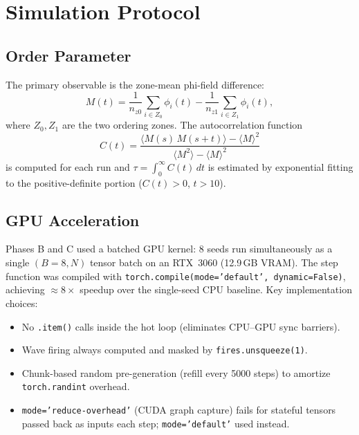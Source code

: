 \documentclass[12pt,a4paper]{article}
\begin{document}
\section{Simulation Protocol}

\subsection{Order Parameter}

The primary observable is the zone-mean phi-field difference:
\begin{equation}
  M(t) = \frac{1}{n_{z0}}\sum_{i \in Z_0} \phi_i(t)
        - \frac{1}{n_{z1}}\sum_{i \in Z_1} \phi_i(t),
\end{equation}
where $Z_0, Z_1$ are the two ordering zones.  The autocorrelation function
\begin{equation}
  C(t) = \frac{\langle M(s)\,M(s+t)\rangle - \langle M\rangle^2}
              {\langle M^2\rangle - \langle M\rangle^2}
\end{equation}
is computed for each run and $\tau = \int_0^\infty C(t)\,dt$ is estimated
by exponential fitting to the positive-definite portion ($C(t) > 0$, $t > 10$).

\subsection{GPU Acceleration}

Phases B and C used a batched GPU kernel: 8 seeds run simultaneously as a single
$(B=8, N)$ tensor batch on an RTX~3060 (12.9\,GB VRAM).  The step function was
compiled with \texttt{torch.compile(mode='default', dynamic=False)}, achieving
$\approx 8\times$ speedup over the single-seed CPU baseline.  Key implementation
choices:
\begin{itemize}
  \item No \texttt{.item()} calls inside the hot loop (eliminates CPU--GPU sync barriers).
  \item Wave firing always computed and masked by \texttt{fires.unsqueeze(1)}.
  \item Chunk-based random pre-generation (refill every 5000 steps) to amortize
        \texttt{torch.randint} overhead.
  \item \texttt{mode='reduce-overhead'} (CUDA graph capture) fails for stateful
        tensors passed back as inputs each step; \texttt{mode='default'} used instead.
\end{itemize}
\end{document}
